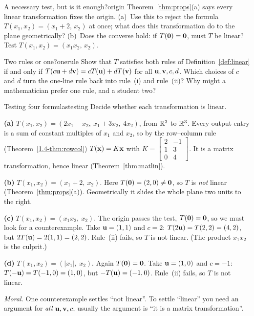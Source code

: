 \documentclass[11pt]{article}
\begin{document}
\begin{think}{A necessary test, but is it enough?}{origin}
Theorem~\ref{thm:props}(a) says every linear transformation fixes the origin. (a)~Use this to reject the formula $T(x_1,x_2)=(x_1+2,\,x_2)$ at once; what does this transformation do to the plane geometrically? (b)~Does the converse hold: if $T(\mathbf{0})=\mathbf{0}$, must $T$ be linear? Test $T(x_1,x_2)=(x_1x_2,\,x_2)$.
\end{think}

\begin{think}{Two rules or one?}{onerule}
Show that $T$ satisfies both rules of Definition~\ref{def:linear} if and only if $T(c\mathbf{u}+d\mathbf{v})=cT(\mathbf{u})+dT(\mathbf{v})$ for all $\mathbf{u},\mathbf{v},c,d$. Which choices of $c$ and $d$ turn the one-line rule back into rule~(i) and rule~(ii)? Why might a mathematician prefer one rule, and a student two?
\end{think}

\begin{exmp}{Testing four formulas}{testing}
Decide whether each transformation is linear.

\textbf{(a)} $T(x_1,x_2)=(2x_1-x_2,\ x_1+3x_2,\ 4x_2)$, from $\mathbb{R}^2$ to $\mathbb{R}^3$. Every output entry is a sum of constant multiples of $x_1$ and $x_2$, so by the row--column rule (Theorem~\ref{1.4-thm:rowcol}) $T(\mathbf{x})=K\mathbf{x}$ with $K=\begin{bmatrix}2&-1\\1&3\\0&4\end{bmatrix}$. It is a matrix transformation, hence linear (Theorem~\ref{thm:matlin}).

\textbf{(b)} $T(x_1,x_2)=(x_1+2,\ x_2)$. Here $T(\mathbf{0})=(2,0)\neq\mathbf{0}$, so $T$ is \emph{not} linear (Theorem~\ref{thm:props}(a)). Geometrically it slides the whole plane two units to the right.

\textbf{(c)} $T(x_1,x_2)=(x_1x_2,\ x_2)$. The origin passes the test, $T(\mathbf{0})=\mathbf{0}$, so we must look for a counterexample. Take $\mathbf{u}=(1,1)$ and $c=2$: $T(2\mathbf{u})=T(2,2)=(4,2)$, but $2T(\mathbf{u})=2(1,1)=(2,2)$. Rule~(ii) fails, so $T$ is not linear. (The product $x_1x_2$ is the culprit.)

\textbf{(d)} $T(x_1,x_2)=(|x_1|,\ x_2)$. Again $T(\mathbf{0})=\mathbf{0}$. Take $\mathbf{u}=(1,0)$ and $c=-1$: $T(-\mathbf{u})=T(-1,0)=(1,0)$, but $-T(\mathbf{u})=(-1,0)$. Rule~(ii) fails, so $T$ is not linear.

\emph{Moral.} One counterexample settles ``not linear''. To settle ``linear'' you need an argument for \emph{all} $\mathbf{u},\mathbf{v},c$; usually the argument is ``it is a matrix transformation''.
\end{exmp}
\end{document}
